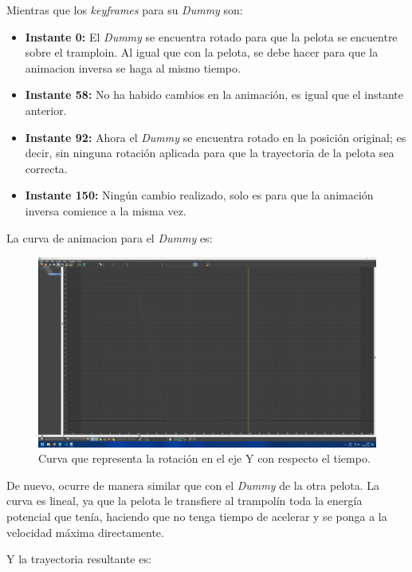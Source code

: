 \documentclass{article}
\begin{document}
Mientras que los \textit{keyframes} para su \textit{Dummy} son:

\begin{itemize}
    \item \textbf{Instante 0: }El \textit{Dummy} se encuentra rotado para que la pelota se encuentre sobre el tramploin. Al igual que con la pelota, se debe hacer para que la animacion inversa se haga al mismo tiempo.
    \item \textbf{Instante 58: }No ha habido cambios en la animación, es igual que el instante anterior.
    \item \textbf{Instante 92: }Ahora el \textit{Dummy} se encuentra rotado en la posición original; es decir, sin ninguna rotación aplicada para que la trayectoria de la pelota sea correcta.
    \item \textbf{Instante 150: }Ningún cambio realizado, solo es para que la animación inversa comience a la misma vez.
\end{itemize}

La curva de animacion para el \textit{Dummy} es:

\begin{figure}[H]
    \centering
    \includegraphics[width=\textwidth]{imagenes/curvas/PR/dummy/green.png}
    \caption{Curva que representa la rotación en el eje Y con respecto el tiempo.}
 \end{figure}

De nuevo, ocurre de manera similar que con el \textit{Dummy} de la otra pelota. La curva es lineal, ya que la pelota le transfiere al trampolín toda la energía potencial que tenía, haciendo que no tenga tiempo de acelerar y se ponga a la velocidad máxima directamente.

Y la trayectoria resultante es:
\end{document}
